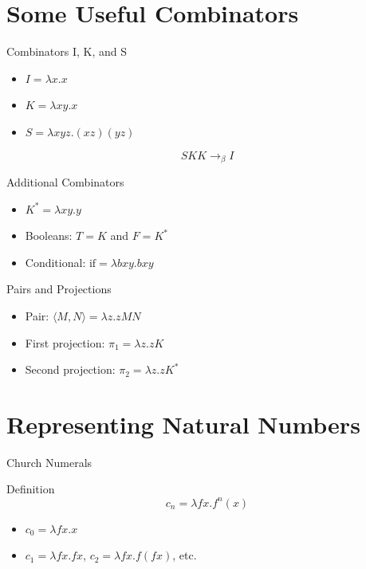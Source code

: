 \documentclass{beamer}
\begin{document}
\section{Some Useful Combinators}
\begin{frame}{Combinators I, K, and S}
  \begin{itemize}
    \item \( I = \lambda x.x \)
    \item \( K = \lambda xy.x \)
    \item \( S = \lambda xyz. (xz)(yz) \)
  \end{itemize}
  \vspace{1em}
  \[
    SKK \rightarrow_\beta I
  \]
\end{frame}

\begin{frame}{Additional Combinators}
  \begin{itemize}
    \item \( K^* = \lambda xy.y \)
    \item Booleans: \(T = K\) and \(F = K^*\)
    \item Conditional: \(\text{if} = \lambda bxy. bxy\)
  \end{itemize}
\end{frame}

\begin{frame}{Pairs and Projections}
  \begin{itemize}
    \item Pair: \(\langle M, N \rangle = \lambda z. zMN\)
    \item First projection: \(\pi_1 = \lambda z. zK\)
    \item Second projection: \(\pi_2 = \lambda z. zK^*\)
  \end{itemize}
\end{frame}

\section{Representing Natural Numbers}
\begin{frame}{Church Numerals}
  \begin{block}{Definition}
    \[
    c_n = \lambda f x. f^n(x)
    \]
    \begin{itemize}
      \item \(c_0 = \lambda f x. x\)
      \item \(c_1 = \lambda f x. f x\), \(c_2 = \lambda f x. f (f x)\), etc.
    \end{itemize}
  \end{block}
\end{frame}
\end{document}
